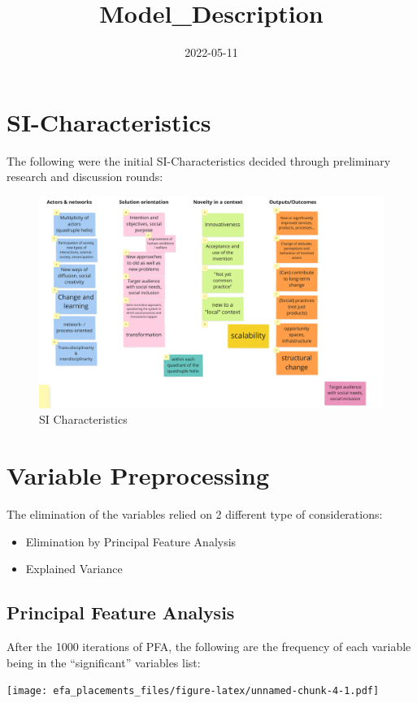 \documentclass[
]{article}
\title{Model\_Description}
\author{}
\date{\vspace{-2.5em}2022-05-11}
\begin{document}
\maketitle

\hypertarget{si-characteristics}{%
\section{SI-Characteristics}\label{si-characteristics}}

The following were the initial SI-Characteristics decided through
preliminary research and discussion rounds:

\begin{figure}

{\centering \includegraphics[width=0.3\linewidth]{../06_model/SIVOCS - SI characteristics} 

}

\caption{SI Characteristics}\label{fig:unnamed-chunk-2}
\end{figure}

\hypertarget{variable-preprocessing}{%
\section{Variable Preprocessing}\label{variable-preprocessing}}

The elimination of the variables relied on 2 different type of
considerations:

\begin{itemize}
\item
  Elimination by Principal Feature Analysis
\item
  Explained Variance
\end{itemize}

\hypertarget{principal-feature-analysis}{%
\subsection{Principal Feature
Analysis}\label{principal-feature-analysis}}

After the 1000 iterations of PFA, the following are the frequency of
each variable being in the ``significant'' variables list:

\texttt{[image: efa\_placements\_files/figure-latex/unnamed-chunk-4-1.pdf]}
\end{document}

